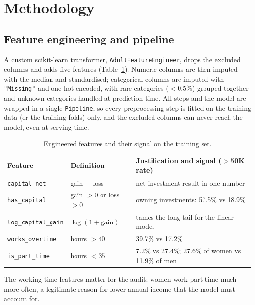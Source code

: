 \documentclass[11pt,a4paper]{article}
\begin{document}
\section{Methodology}

\subsection{Feature engineering and pipeline}

A custom scikit-learn transformer, \texttt{AdultFeatureEngineer}, drops the excluded columns and adds five features (Table~\ref{tab:features}). Numeric columns are then imputed with the median and standardised; categorical columns are imputed with \texttt{"Missing"} and one-hot encoded, with rare categories ($<$0.5\%) grouped together and unknown categories handled at prediction time. All steps and the model are wrapped in a single \texttt{Pipeline}, so every preprocessing step is fitted on the training data (or the training folds) only, and the excluded columns can never reach the model, even at serving time.

\begin{table}[H]
\centering\small
\caption{Engineered features and their signal on the training set.}
\label{tab:features}
\begin{tabularx}{\textwidth}{llX}
\toprule
\rowcolor{headblue}
Feature & Definition & Justification and signal ($>$50K rate) \\
\midrule
\texttt{capital\_net} & gain $-$ loss & net investment result in one number \\
\texttt{has\_capital} & gain $>0$ or loss $>0$ & owning investments: 57.5\% vs 18.9\% \\
\texttt{log\_capital\_gain} & $\log(1+\text{gain})$ & tames the long tail for the linear model \\
\texttt{works\_overtime} & hours $>40$ & 39.7\% vs 17.2\% \\
\texttt{is\_part\_time} & hours $<35$ & 7.2\% vs 27.4\%; 27.6\% of women vs 11.9\% of men \\
\bottomrule
\end{tabularx}
\end{table}

The working-time features matter for the audit: women work part-time much more often, a legitimate reason for lower annual income that the model must account for.
\end{document}
